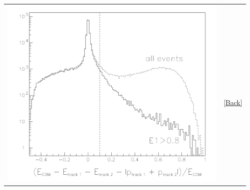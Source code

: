 \documentclass[landscape]{article}
\newenvironment{lastslide}{\mbox{ }\vfill}{\vfill \mbox{ }}
\begin{document}
\begin{lastslide}
  \begin{tabular}{p{0.88\linewidth} p{0.1\linewidth}}
    \begin{minipage}{\linewidth}
      \includegraphics[width=\linewidth]{bhabha_discrimination.pdf}
    \end{minipage} & 
    \begin{minipage}{\linewidth}
      \hypertarget{lastplot}{\mbox{ }} \href{#cutseffective}{[Back]}
    \end{minipage}
  \end{tabular}
\end{lastslide}
\end{document}
